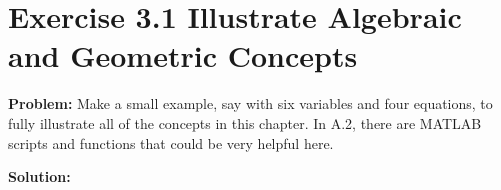 \section{Exercise 3.1 Illustrate Algebraic and Geometric Concepts}
\textbf{Problem:} Make a small example, say with six variables and four equations, to fully illustrate all of the concepts in this chapter. In A.2, there are MATLAB scripts and functions that could be very helpful here.

\textbf{Solution:}